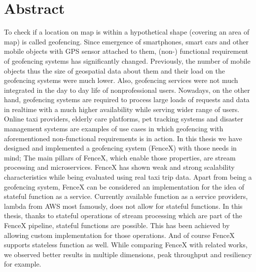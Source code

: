 \documentclass[a4]{report}
\begin{document}
    \section{Abstract}
    To check if a location on map is within a hypothetical shape (covering an area of map) is called geofencing.
    Since emergence of smartphones, smart cars and other mobile objects with GPS sensor attached to them, (non-)
    functional requirement of geofencing systems has significantly changed.
    Previously, the number of mobile objects thus the size of geospatial data about them and their load on the
    geofencing systems were much lower.
    Also, geofencing services were not much integrated in the day to day life of nonprofessional users.
    Nowadays, on the other hand, geofencing systems are required to process large loads of requests and data in
    realtime with a much higher availability while serving wider range of users.
    Online taxi providers, elderly care platforms, pet tracking systems and disaster management systems are examples
    of use cases in which geofencing with aforementioned non-functional requirements is in action.
    In this thesis we have designed and implemented a geofencing system (FenceX) with those needs in mind;
    The main pillars of FenceX, which enable those properties, are stream processing and microservices.
    FenceX has shown weak and strong scalability characteristics while being evaluated using real taxi trip data.
    Apart from being a geofencing system, FenceX can be considered an implementation for the idea of stateful function
    as a service.
    Currently available function as a service providers, lambda from AWS most famously, does not allow for stateful
    functions.
    In this thesis, thanks to stateful operations of stream processing which are part of the FenceX pipeline, stateful
    functions are possible.
    This has been achieved by allowing custom implementation for those operations.
    And of course FenceX supports stateless function as well.
    While comparing FenceX with related works, we observed better results in multiple dimensions, peak throughput
    and resiliency for example.

    \newpage

    \tableofcontents

    \listoffigures

    \listoftables

    \newpage
\end{document}
